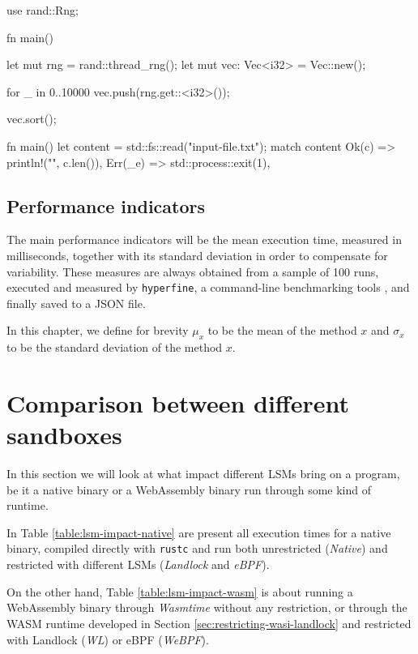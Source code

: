\vspace*{0.5cm}
\begin{code}[language=Rust, caption=The tested ``sorting program''., label=lst:sorting-test-rust]
use rand::Rng;

fn main() {
  let mut rng = rand::thread_rng();
  let mut vec: Vec<i32> = Vec::new();

  for _ in 0..10000 {
    vec.push(rng.get::<i32>());
  }

  vec.sort();
}
\end{code}

\begin{code}[language=Rust, caption=The tested ``reading program''., label=lst:reading-test-rust]
fn main() {
  let content = std::fs::read("input-file.txt");
  match content {
      Ok(c) => println!("{}", c.len()),
      Err(_e) => std::process::exit(1),
  }
}
\end{code}

\subsection{Performance indicators}

The main performance indicators will be the mean execution time, measured in milliseconds, together with its
standard deviation in order to compensate for variability.
These measures are always obtained from a sample of 100 runs, executed and measured by \texttt{hyperfine},
a command-line benchmarking tools \cite{hyperfine}, and finally saved to a
JSON file.

In this chapter, we define for brevity $\mu_x$ to be the mean of the method $x$ and $\sigma_x$ to be
the standard deviation of the method $x$.

\section{Comparison between different sandboxes}

In this section we will look at what impact different LSMs bring on a program,
be it a native binary or a WebAssembly binary run through some kind of runtime.

In Table \ref{table:lsm-impact-native} are present all execution times for a native binary,
compiled directly with \texttt{rustc} and run both unrestricted (\textit{Native}) and restricted
with different LSMs (\textit{Landlock} and \textit{eBPF}).

On the other hand, Table \ref{table:lsm-impact-wasm} is about running a WebAssembly binary through
\textit{Wasmtime} without any restriction, or through the WASM runtime developed in Section \ref{sec:restricting-wasi-landlock}
and restricted with Landlock (\textit{WL}) or eBPF (\textit{WeBPF}).

